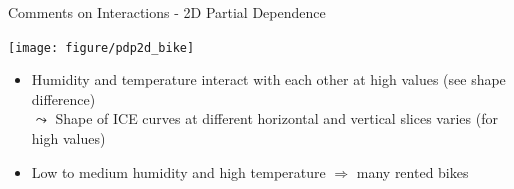 \documentclass[11pt,compress,t,notes=noshow, aspectratio=169, xcolor=table]{beamer}
\begin{document}
\begin{frame}{Comments on Interactions - 2D Partial Dependence}

\begin{center}
\texttt{[image: figure/pdp2d\_bike]}
\end{center}

\begin{itemize}
 \item Humidity and temperature interact with each other at high values (see shape difference)\\
 $\leadsto$ Shape of ICE curves at different horizontal and vertical slices varies (for high values)
 \item Low to medium humidity and high temperature $\Rightarrow$ many rented bikes
\end{itemize}


%

\end{frame}
\end{document}
